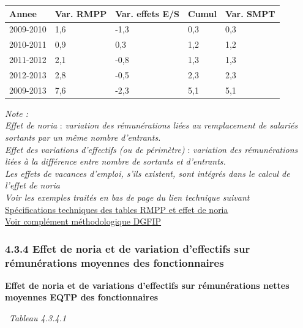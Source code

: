 \begin{longtable}[]{@{}lllll@{}}
\toprule
Annee & Var. RMPP & Var. effets E/S & Cumul & Var. SMPT\tabularnewline
\midrule
\endhead
2009-2010 & 1,6 & -1,3 & 0,3 & 0,3\tabularnewline
2010-2011 & 0,9 & 0,3 & 1,2 & 1,2\tabularnewline
2011-2012 & 2,1 & -0,8 & 1,3 & 1,3\tabularnewline
2012-2013 & 2,8 & -0,5 & 2,3 & 2,3\tabularnewline
2009-2013 & 7,6 & -2,3 & 5,1 & 5,1\tabularnewline
\bottomrule
\end{longtable}

\emph{Note :}\\
\emph{Effet de noria} : \emph{variation des rémunérations liées au
remplacement de salariés sortants par un même nombre d'entrants.}\\
\emph{Effet des variations d'effectifs (ou de périmètre)} :
\emph{variation des rémunérations liées à la différence entre nombre de
sortants et d'entrants.}\\
\emph{Les effets de vacances d'emploi, s'ils existent, sont intégrés
dans le calcul de l'effet de noria}\\
\emph{Voir les exemples traités en bas de page du lien technique
suivant}\\
\href{../Docs/Notices/noria.html}{Spécifications techniques des tables RMPP
et effet de noria}\\
\href{../Docs/Notices/GVT\%20et\%20noria.pdf}{Voir complément
méthodologique DGFIP}

\hypertarget{effet-de-noria-et-de-variation-deffectifs-sur-remunerations-moyennes-des-fonctionnaires}{%
\subsubsection{4.3.4 Effet de noria et de variation d'effectifs sur
rémunérations moyennes des
fonctionnaires}\label{effet-de-noria-et-de-variation-deffectifs-sur-remunerations-moyennes-des-fonctionnaires}}

\textbf{Effet de noria et de variations d'effectifs sur rémunérations
nettes moyennes EQTP des fonctionnaires}

~\emph{Tableau 4.3.4.1}

